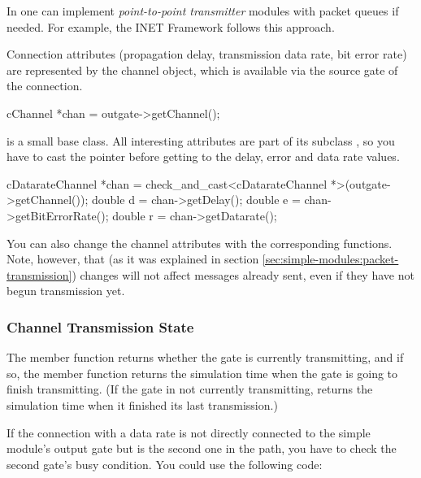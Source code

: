 In {\opp} one can implement \textit{point-to-point transmitter} modules
with packet queues if needed. For example, the INET Framework
follows this approach.





Connection attributes (propagation delay, transmission data rate,
bit error rate) are represented by the channel object, which
is available via the source gate of the connection.

\begin{cpp}
cChannel *chan = outgate->getChannel();
\end{cpp}

 is a small base class. All interesting attributes are
part of its subclass , so you have to cast the pointer
before getting to the delay, error and data rate values.

\begin{cpp}
cDatarateChannel *chan = check_and_cast<cDatarateChannel *>(outgate->getChannel());
double d = chan->getDelay();
double e = chan->getBitErrorRate();
double r = chan->getDatarate();
\end{cpp}

You can also change the channel attributes with the corresponding
 functions. Note, however, that (as it was explained in
section \ref{sec:simple-modules:packet-transmission})
changes will not affect messages already sent, even if they have not
begun transmission yet.

\subsubsection{Channel Transmission State}
\label{sec:simple-modules:cgate-transmission-state}

The  member function returns whether the gate
is currently transmitting, and if so, the
 member function
returns the simulation time when the gate is going to finish
transmitting. (If the gate in not currently transmitting,
 returns the simulation time
when it finished its last transmission.)

If the connection with a data rate is not directly connected
to the simple module's output gate but is the second
one in the path, you have to check the second gate's busy
condition. You could use the following
code:

